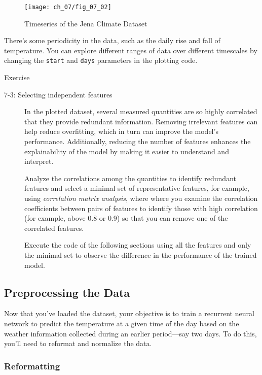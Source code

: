 \begin{figure}[H]
	\texttt{[image: ch\_07/fig\_07\_02]} 
	\caption{Timeseries of the Jena Climate Dataset}
	\label{fig:07:02}
\end{figure}

There's some periodicity in the data, such as the daily rise and fall of temperature. You can explore different ranges of data over different timescales by changing the \lstinline{start} and \lstinline{days} parameters in the plotting code.

\begin{nspbox}{Exercise}
\begin{description}
	\item[7-3: Selecting independent features] 
    In the plotted dataset, several measured quantities are so highly correlated that they provide redundant information. Removing irrelevant features can help reduce overfitting, which in turn can improve the model's performance. Additionally, reducing the number of features enhances the explainability of the model by making it easier to understand and interpret.
    
    Analyze the correlations among the quantities to identify redundant features and select a minimal set of representative features, for example, using \emph{correlation matrix analysis}, where where you examine the correlation coefficients between pairs of features to identify those with high correlation (for example, above 0.8 or 0.9) so that you can remove one of the correlated features.
    
    Execute the code of the following sections using all the features and only the minimal set to observe the difference in the performance of the trained model. 
\end{description}
\end{nspbox}

\subsection{Preprocessing the Data}

Now that you've loaded the dataset, your objective is to train a recurrent neural network to predict the temperature at a given time of the day based on the weather information collected during an earlier period---say two days. To do this, you'll need to reformat and normalize the data.

\subsubsection{Reformatting}

